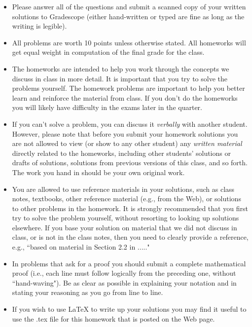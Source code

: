\documentclass[11pt]{article}
\begin{document}
 \begin{itemize}

\item
Please answer all of the questions and submit a scanned copy of your written solutions to Gradescope 
(either hand-written or typed are fine as long as the writing is legible). 

\item
All problems are worth 10 points unless otherwise stated.  All homeworks will get equal weight in computation of the final grade for the class.
 \item
The homeworks are intended to help you work through the concepts
we discuss in class in  more detail. It is important that you try
to solve the problems yourself. The homework problems are important to help you better
learn and reinforce the material from class. If you don't
do the homeworks you will likely have difficulty in the exams
later in the quarter.

\item If you can't solve a
problem, you can discuss it {\it verbally} with another student. However, please note that before you submit your homework solutions you
are not allowed to view (or show to any other student) any {\it written material} directly related to the homeworks, including other students' solutions or drafts of solutions, solutions from previous versions of this class, and so forth. The work you hand in should be your own original work.

\item You are allowed to use reference materials in your solutions, such as class notes, textbooks,  other reference material (e.g., from the Web), or solutions to other problems in the homework. It is strongly recommended that you first try to solve the problem yourself, without resorting to looking up solutions elsewhere. If you base your solution on material that we did not discuss in class, or is not in the class notes, then you need to clearly provide a reference, e.g., ``based on material in Section 2.2 in ....."


\item
In problems that ask for a proof you should submit a complete mathematical
proof (i.e., each line must follow logically from the preceding one, without
``hand-waving"). Be as clear as possible in explaining
 your notation and in stating your reasoning as you go from line to line.  


\item
If you wish to use LaTeX to write up
your solutions you may find it useful to use the .tex file for  this homework
that is posted on the Web page. 






\end{itemize}
\end{document}
